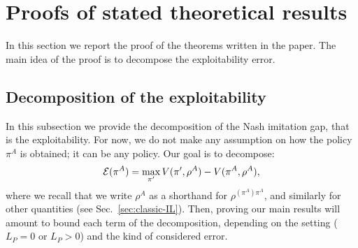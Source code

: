 \documentclass{article}
\begin{document}
\section{Proofs of stated theoretical results}
\label{sec:proofs}

In this section we report the proof of the theorems written in the paper. The main idea of the proof is to decompose the exploitability error. 

\subsection{Decomposition of the exploitability}
In this subsection we provide the decomposition of the Nash imitation gap, that is the exploitability. For now, we do not make any assumption on how the policy $\pi^A$ is obtained; it can be any policy. Our goal is to decompose:
\begin{equation}
    \mathcal{E}(\pi^A) = \max_{\pi'} V(\pi', \rho^A) - V(\pi^A, \rho^A),
\end{equation}
where we recall that we write $\rho^A$ as a shorthand for $\rho^{(\pi^A)\pi^A}$, and similarly for other quantities (see Sec.~\ref{sec:classic-IL}). 
Then, proving our main results will amount to bound each term of the decomposition, depending on the setting ($L_P=0$ or $L_P>0$) and the kind of considered error. 
\end{document}
